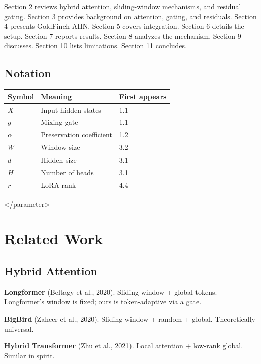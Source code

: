Section 2 reviews hybrid attention, sliding-window mechanisms, and residual 
gating. Section 3 provides background on attention, gating, and residuals. 
Section 4 presents GoldFinch-AHN. Section 5 covers integration. Section 6 
details the setup. Section 7 reports results. Section 8 analyzes the 
mechanism. Section 9 discusses. Section 10 lists limitations. Section 11 
concludes.



\subsection{Notation}

\begin{table}[H]
\centering
\small
\begin{tabular}{lll}
\toprule
\textbf{Symbol} & \textbf{Meaning} & \textbf{First appears} \\
\midrule
$X$ & Input hidden states & 1.1 \\
$g$ & Mixing gate & 1.1 \\
$\alpha$ & Preservation coefficient & 1.2 \\
$W$ & Window size & 3.2 \\
$d$ & Hidden size & 3.1 \\
$H$ & Number of heads & 3.1 \\
$r$ & LoRA rank & 4.4 \\
\bottomrule
\end{tabular}
\end{table}
\textless{}/parameter\textgreater{}




\section{Related Work}

\subsection{Hybrid Attention}

\textbf{Longformer} (Beltagy et al., 2020). Sliding-window + global tokens. 
Longformer's window is fixed; ours is token-adaptive via a gate.

\textbf{BigBird} (Zaheer et al., 2020). Sliding-window + random + global. 
Theoretically universal.

\textbf{Hybrid Transformer} (Zhu et al., 2021). Local attention + low-rank 
global. Similar in spirit.

